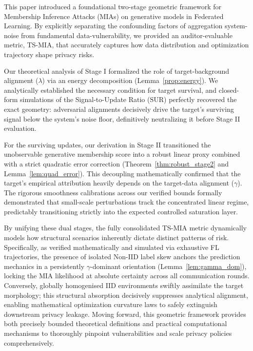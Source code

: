 \documentclass[bdcc,article,submit,pdftex]{Definitions/mdpi}
\begin{document}
This paper introduced a foundational two-stage geometric framework for Membership Inference Attacks (MIAs) on generative models in Federated Learning. By explicitly separating the confounding factors of aggregation system-noise from fundamental data-vulnerability, we provided an auditor-evaluable metric, TS-MIA, that accurately captures how data distribution and optimization trajectory shape privacy risks. 

Our theoretical analysis of Stage I formalized the role of target-background alignment ($\lambda$) via an energy decomposition (Lemma~\ref{prop:energy}). We analytically established the necessary condition for target survival, and closed-form simulations of the Signal-to-Update Ratio ($\mathrm{SUR}$) perfectly recovered the exact geometry: adversarial alignments decisively drive the target's surviving signal below the system's noise floor, definitively neutralizing it before Stage II evaluation.

For the surviving updates, our derivation in Stage II transitioned the unobservable generative membership score into a robust linear proxy combined with a strict quadratic error correction (Theorem~\ref{thm:robust_stage2} and Lemma~\ref{lem:quad_error}). This decoupling mathematically confirmed that the target's empirical attribution heavily depends on the target-data alignment ($\gamma$). The rigorous smoothness calibrations across our verified bounds formally demonstrated that small-scale perturbations track the concentrated linear regime, predictably transitioning strictly into the expected controlled saturation layer. 

By unifying these dual stages, the fully consolidated TS-MIA metric dynamically models how structural scenarios inherently dictate distinct patterns of risk. Specifically, as verified mathematically and simulated via exhaustive FL trajectories, the presence of isolated Non-IID label skew anchors the prediction mechanics in a persistently $\gamma$-dominant orientation (Lemma~\ref{lem:gamma_dom}), locking the MIA likelihood at absolute certainty across all communication rounds. Conversely, globally homogenised IID environments swiftly assimilate the target morphology; this structural absorption decisively suppresses analytical alignment, enabling mathematical optimization curvature laws to safely extinguish downstream privacy leakage. Moving forward, this geometric framework provides both precisely bounded theoretical definitions and practical computational mechanisms to thoroughly pinpoint vulnerabilities and scale privacy policies comprehensively.
\end{document}
